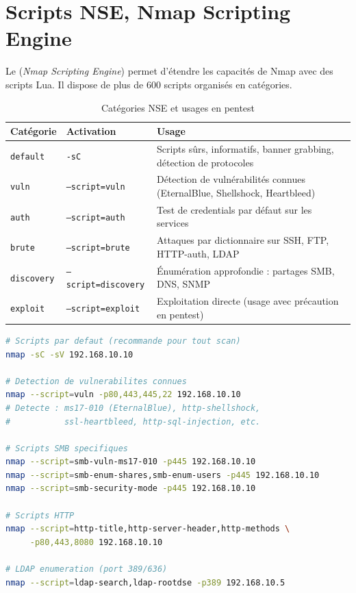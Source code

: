 \section{Scripts NSE, Nmap Scripting Engine}
\label{sec:nse}

Le  (\textit{Nmap Scripting Engine}) permet d'étendre les
capacités de Nmap avec des scripts Lua. Il dispose de plus de 600 scripts
organisés en catégories.

\begin{table}[htbp]
\centering
\caption{Catégories NSE et usages en pentest}
\label{tab:nse_categories}
\begin{tabular}{p{2.5cm}p{4cm}p{6.5cm}}
\toprule
\textbf{Catégorie} & \textbf{Activation} & \textbf{Usage} \\
\midrule
\texttt{default}
    & \texttt{-sC}
    & Scripts sûrs, informatifs, banner grabbing, détection de protocoles \\
\addlinespace
\texttt{vuln}
    & \texttt{--script=vuln}
    & Détection de vulnérabilités connues (EternalBlue, Shellshock, Heartbleed) \\
\addlinespace
\texttt{auth}
    & \texttt{--script=auth}
    & Test de credentials par défaut sur les services \\
\addlinespace
\texttt{brute}
    & \texttt{--script=brute}
    & Attaques par dictionnaire sur SSH, FTP, HTTP-auth, LDAP \\
\addlinespace
\texttt{discovery}
    & \texttt{--script=discovery}
    & Énumération approfondie : partages SMB, DNS, SNMP \\
\addlinespace
\texttt{exploit}
    & \texttt{--script=exploit}
    & Exploitation directe (usage avec précaution en pentest) \\
\bottomrule
\end{tabular}
\end{table}

\begin{lstlisting}[language=bash, caption={Utilisation avancée des scripts NSE}]
# Scripts par defaut (recommande pour tout scan)
nmap -sC -sV 192.168.10.10

# Detection de vulnerabilites connues
nmap --script=vuln -p80,443,445,22 192.168.10.10
# Detecte : ms17-010 (EternalBlue), http-shellshock,
#           ssl-heartbleed, http-sql-injection, etc.

# Scripts SMB specifiques
nmap --script=smb-vuln-ms17-010 -p445 192.168.10.10
nmap --script=smb-enum-shares,smb-enum-users -p445 192.168.10.10
nmap --script=smb-security-mode -p445 192.168.10.10

# Scripts HTTP
nmap --script=http-title,http-server-header,http-methods \
     -p80,443,8080 192.168.10.10

# LDAP enumeration (port 389/636)
nmap --script=ldap-search,ldap-rootdse -p389 192.168.10.5
\end{lstlisting}

